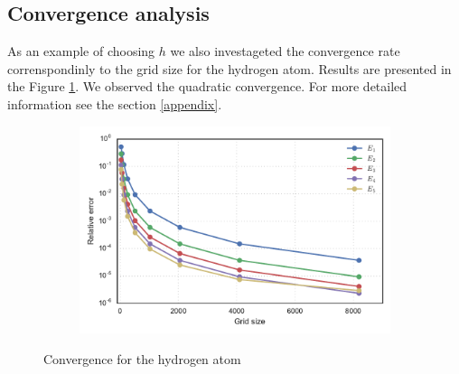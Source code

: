 \documentclass[a4paper, 12pt]{article}
\begin{document}
\subsection{Convergence analysis}
As an example of choosing $h$ we also investageted the convergence rate correnspondinly to the grid size for the hydrogen atom.  Results are presented in the Figure \ref{h2_grid}. We observed the quadratic convergence. For more detailed information see the section \ref{appendix}.
\begin{figure}[h!]
\centering
\begin{subfigure}{.5\textwidth}
  \centering
  \includegraphics[width=1.0\linewidth]{h2_grid.pdf}
\end{subfigure}
\caption{Convergence for the hydrogen atom}
\label{h2_grid}
\end{figure}
\end{document}
